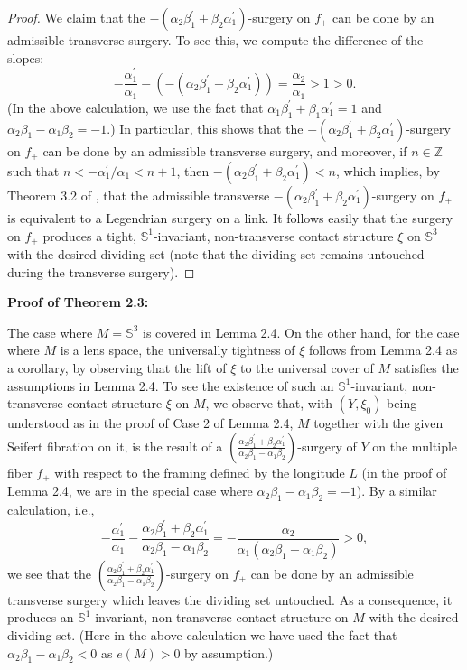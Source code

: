 \documentclass[11pt]{amsart}
\theoremstyle{plain}
\numberwithin{theorem}{section}
\theoremstyle{definition}
\newcommand{\Z}{{\mathbb Z}}
\newcommand{\s}{{\mathbb S}}
\begin{document}
\begin{proof}
We claim that the $-(\alpha_2\beta_1^\prime+\beta_2\alpha_1^\prime)$-surgery on $f_{+}$ can be
done by an admissible transverse surgery. To see this, we compute the difference of the slopes: 
$$
-\frac{\alpha_1^\prime}{\alpha_1}-(-(\alpha_2\beta_1^\prime+\beta_2\alpha_1^\prime))=\frac{\alpha_2}{\alpha_1}>1>0. 
$$
(In the above calculation, we use the fact that $\alpha_1\beta_1^\prime+\beta_1\alpha_1^\prime=1$
and $\alpha_2\beta_1-\alpha_1\beta_2=-1$.)
In particular, this shows that the $-(\alpha_2\beta_1^\prime+\beta_2\alpha_1^\prime)$-surgery on $f_{+}$ can be done by an admissible transverse surgery, and moreover, if $n\in\Z$ such that 
$n<-\alpha_1^\prime/\alpha_1<n+1$, then  $-(\alpha_2\beta_1^\prime+\beta_2\alpha_1^\prime)<n$,
which implies, by Theorem 3.2 of \cite{BE}, that the admissible transverse 
$-(\alpha_2\beta_1^\prime+\beta_2\alpha_1^\prime)$-surgery on $f_{+}$ is equivalent to a
Legendrian surgery on a link. It follows easily that the surgery on $f_{+}$ produces a tight, 
$\s^1$-invariant, non-transverse contact structure $\xi$ on $\s^3$ with the desired dividing set
(note that the dividing set remains untouched during the transverse surgery). 

\end{proof}

{\bf Proof of Theorem 2.3:}

\vspace{2mm}

The case where $M=\s^3$ is covered in Lemma 2.4. On the other hand, for the case where $M$ is a lens space, the universally tightness of $\xi$ follows from Lemma 2.4 as a corollary, by observing that the lift of $\xi$ to the universal cover of $M$ satisfies the assumptions in Lemma 2.4. To see the existence of such an $\s^1$-invariant, non-transverse contact structure $\xi$ on $M$, we observe that, 
with $(Y,\xi_0)$ being understood as in the proof of Case 2 of Lemma 2.4, $M$ together with the given Seifert fibration on it, is the result of a $(\frac{\alpha_2\beta_1^\prime+\beta_2\alpha_1^\prime}{\alpha_2\beta_1-\alpha_1\beta_2})$-surgery of $Y$ on the multiple fiber $f_{+}$ with respect to the framing defined by the longitude $L$ (in the proof of Lemma 2.4, we are in the special case where 
$\alpha_2\beta_1-\alpha_1\beta_2=-1$). By a similar calculation, i.e.,
$$
-\frac{\alpha_1^\prime}{\alpha_1}-\frac{\alpha_2\beta_1^\prime+\beta_2\alpha_1^\prime}{\alpha_2\beta_1-\alpha_1\beta_2}=-\frac{\alpha_2}{\alpha_1(\alpha_2\beta_1-\alpha_1\beta_2)}>0,
$$
we see that the $(\frac{\alpha_2\beta_1^\prime+\beta_2\alpha_1^\prime}{\alpha_2\beta_1-\alpha_1\beta_2})$-surgery on $f_{+}$ can be done by an admissible transverse surgery which leaves the dividing set untouched. 
As a consequence, it produces an $\s^1$-invariant, non-transverse contact structure on $M$ with the desired dividing set. (Here in the above calculation we have used the fact that $\alpha_2\beta_1-\alpha_1\beta_2<0$ as $e(M)>0$ by assumption.) 
\end{document}
